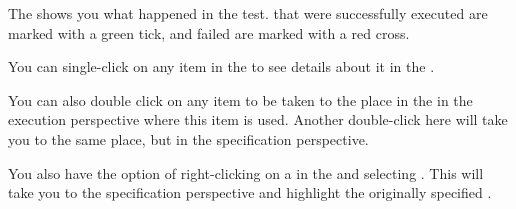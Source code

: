 The \gdtestresultview{} shows you what happened in the test. \gdsteps{} that were successfully executed are marked with a green tick, and failed \gdsteps{} are marked with a red cross. 

You can single-click on any item in the \gdtestresultview{} to see details about it in the \gdpropview{}. 

You can also double click on any item to be taken to the place in the \gdtestcasebrowser{} in the execution perspective where this item is used. Another double-click here will take you to the same place, but in the specification perspective. 

You also have the option of right-clicking on a \gdcase{} in the \gdtestresultview{} and selecting . This will take you to the specification perspective and highlight the originally specified \gdcase{}. 